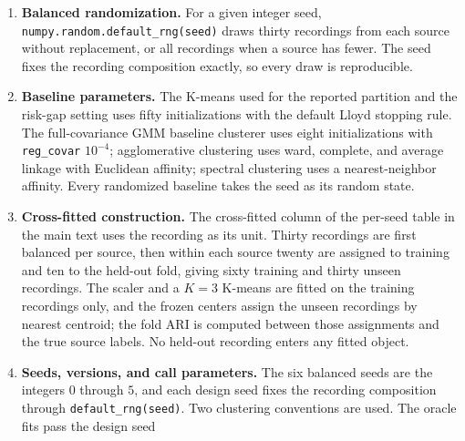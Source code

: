 \begin{enumerate}
  bootstrap rounds, \(M\) indices are drawn with replacement, K-means is
  fitted on the resampled recordings, and its centroids are frozen;
  those centroids assign the original, unresampled recordings through
  nearest-centroid prediction, and the round score is the ARI between
  that prediction and the original K-means labels. The reported
  stability is the mean of the sixty ARIs. The selection threshold is
  \(\min(0.85,0.9\max_K\text{stability})\); candidates with stability
  above the threshold and a positive silhouette are eligible, and the
  eligible candidate with the smallest BIC is chosen. If none is
  eligible, the largest silhouette is used, and if no silhouette is
  positive the smallest BIC is used.
\item
  \textbf{Balanced randomization.} For a given integer seed,
  \texttt{numpy.random\allowbreak.default\_rng(seed)} draws thirty
  recordings from each source without replacement, or all recordings
  when a source has fewer. The seed fixes the recording composition
  exactly, so every draw is reproducible.
\item
  \textbf{Baseline parameters.} The K-means used for the reported
  partition and the risk-gap setting uses fifty initializations with the
  default Lloyd stopping rule. The full-covariance GMM baseline
  clusterer uses eight initializations with \texttt{reg\_covar}
  \(10^{-4}\); agglomerative clustering uses ward, complete, and average
  linkage with Euclidean affinity; spectral clustering uses a
  nearest-neighbor affinity. Every randomized baseline takes the seed as
  its random state.
\item
  \textbf{Cross-fitted construction.} The cross-fitted column of the
  per-seed table in the main text uses the recording as its unit. Thirty
  recordings are first balanced per source, then within each source
  twenty are assigned to training and ten to the held-out fold, giving
  sixty training and thirty unseen recordings. The scaler and a \(K=3\)
  K-means are fitted on the training recordings only, and the frozen
  centers assign the unseen recordings by nearest centroid; the fold ARI
  is computed between those assignments and the true source labels. No
  held-out recording enters any fitted object.
\item
  \textbf{Seeds, versions, and call parameters.} The six balanced seeds
  are the integers \(0\) through \(5\), and each design seed fixes the
  recording composition through \texttt{default\_rng(seed)}. Two
  clustering conventions are used. The oracle fits pass the design seed

\end{enumerate}
